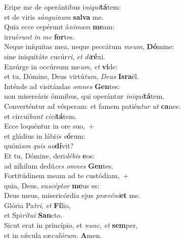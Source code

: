 \evenverse Eripe me de operántibus i\textit{ni}\textit{qui}\textbf{tá}tem:~\*\\
\evenverse et de viris \textit{sán}\textit{gui}\textit{num} \textbf{sal}\textbf{va} me.\\
\oddverse Quia ecce cepérunt á\textit{ni}\textit{mam} \textbf{me}am:~\*\\
\oddverse irrué\textit{runt} \textit{in} \textit{me} \textbf{for}tes.\\
\evenverse Neque iníquitas mea, neque peccátum \textit{me}\textit{um}, \textbf{Dó}mine:~\*\\
\evenverse sine iniquitáte cucúr\textit{ri}, \textit{et} \textit{di}\textbf{ré}xi.\\
\oddverse Exsúrge in occúrsum me\textit{um}, \textit{et} \textbf{vi}de:~\*\\
\oddverse et tu, Dómine, Deus virtú\textit{tum}, \textit{De}\textit{us} \textbf{Is}\textbf{ra}ël.\\
\evenverse Inténde ad visitándas \textit{om}\textit{nes} \textbf{Gen}tes:~\*\\
\evenverse non misereáris ómnibus, qui operántur \textit{i}\textit{ni}\textit{qui}\textbf{tá}tem.\\
\oddverse Converténtur ad vésperam: et famem patién\textit{tur} \textit{ut} \textbf{ca}nes:~\*\\
\oddverse et circuí\textit{bunt} \textit{ci}\textit{vi}\textbf{tá}tem.\\
\evenverse Ecce loquéntur in ore suo,~+\\
\evenverse  et gládius in lábi\textit{is} \textit{e}\textbf{ó}rum:~\*\\
\evenverse quóni\textit{am} \textit{quis} \textit{au}\textbf{dí}vit?\\
\oddverse Et tu, Dómine, deri\textit{dé}\textit{bis} \textbf{e}os:~\*\\
\oddverse ad níhilum dedú\textit{ces} \textit{om}\textit{nes} \textbf{Gen}tes.\\
\evenverse Fortitúdinem meam ad te custódiam,~+\\
\evenverse  quia, Deus, su\textit{scép}\textit{tor} \textbf{me}us es:~\*\\
\evenverse Deus meus, misericórdia ejus \textit{præ}\textit{vé}\textit{ni}\textbf{et} me.\\
\oddverse Glória Pa\textit{tri}, \textit{et} \textbf{Fí}lio,~\*\\
\oddverse et Spi\textit{rí}\textit{tu}\textit{i} \textbf{San}cto.\\
\evenverse Sicut erat in princípio, et \textit{nunc}, \textit{et} \textbf{sem}per,~\*\\
\evenverse et in sǽcula sæ\textit{cu}\textit{ló}\textit{rum}. \textbf{A}men.\\
